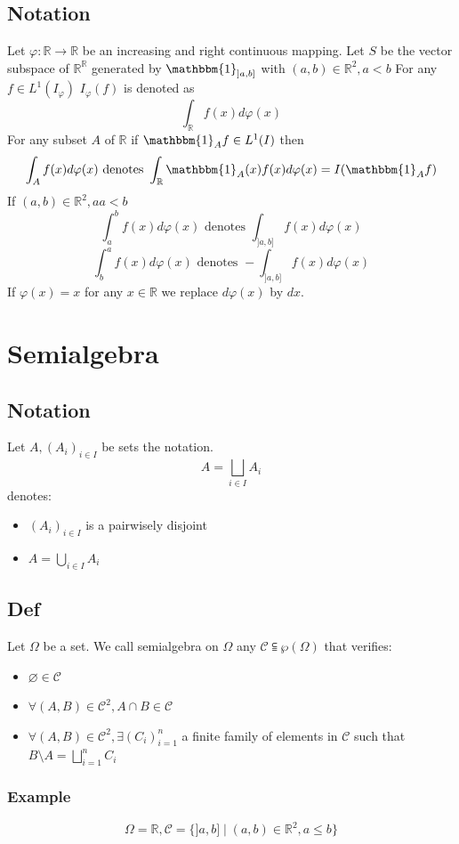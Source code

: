 \documentclass{book}
\newcommand{\rightbracket}{]}
\begin{document}
\section{Notation}
Let $\varphi:\mathbb{R}\rightarrow\mathbb{R}$ be an increasing and right continuous mapping. Let $S$ be the vector subspace of $\mathbb{R}^\mathbb{R}$ generated by $\mathbbm{1}_{\rightbracket a,b\rightbracket}$ with $(a,b)\in \mathbb{R}^2,a<b$ For any $f\in L^1(I_\varphi)$ $I_\varphi(f)$ is denoted as
$$\int_{\mathbb{R}}f(x)d\varphi(x)$$
For any subset $A$ of $\mathbb{R}$ if $\mathbbm{1}_Af\in L^1(I)$ then 
$$\int_Af(x)d\varphi(x)\text{ denotes }\int_{\mathbb{R}}\mathbbm{1}_A(x)f(x)d\varphi(x)=I(\mathbbm{1}_Af)$$
If $(a,b)\in \mathbb{R}^2,aa<b$
$$\int_a^bf(x)d\varphi(x)\text{ denotes }\int_{\rightbracket a,b\rightbracket}f(x)d\varphi(x)$$
$$\int_b^af(x)d\varphi(x)\text{ denotes }-\int_{\rightbracket a,b\rightbracket}f(x)d\varphi(x)$$
If $\varphi(x)=x$ for any $x\in \mathbb{R}$ we replace $d\varphi(x)$ by $dx$. %
\chapter{Semialgebra}
\section{Notation}
Let $A,(A_i)_{i\in I}$ be sets the notation.
$$A=\bigsqcup \limits_{i\in I}A_i$$
denotes:
\begin{itemize}
    \item $(A_i)_{i\in I}$ is a pairwisely disjoint
    \item $A=\bigcup\limits_{i\in I}A_i$
\end{itemize}
\section{Def}
Let $\Omega$ be a set. We call semialgebra on $\Omega$ any $\mathcal{C}\subseteqq\wp(\Omega)$ that verifies:
\begin{itemize}
    \item $\varnothing\in \mathcal{C}$
    \item $\forall(A,B)\in \mathcal{C}^2,A\cap B\in \mathcal{C}$
    \item $\forall(A,B)\in \mathcal{C}^2,\exists(C_i)_{i=1}^n$ a finite family of elements in $\mathcal{C}$ such that $B\setminus A=\bigsqcup\limits_{i=1}^n C_i$
\end{itemize}
\subsection{Example}
$$\Omega=\mathbb{R},\mathcal{C}=\{\rightbracket a,b\rightbracket\mid(a,b)\in\mathbb{R}^2,a\leq b\}$$
\end{document}
